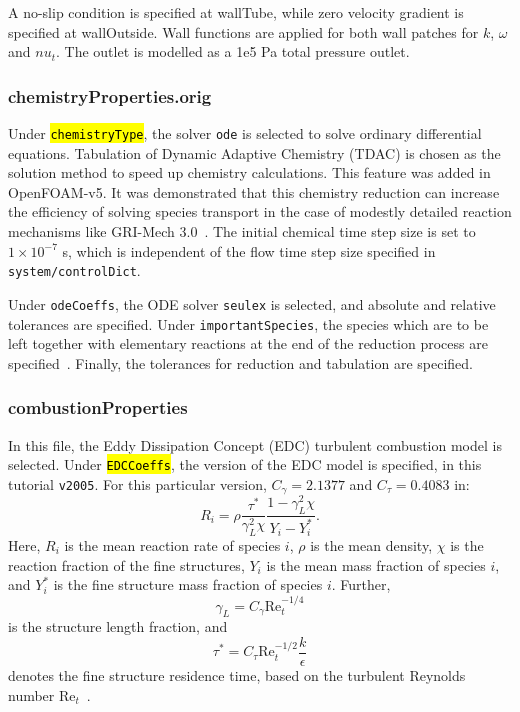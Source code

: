 A no-slip condition is specified at wallTube, while zero velocity gradient is specified at wallOutside. Wall functions are applied for both wall patches for $k$, $\omega$ and $nu_t$. The outlet is modelled as a 1e5 Pa total pressure outlet.

\subsubsection*{chemistryProperties.orig}
Under \hl{\texttt{chemistryType}}, the solver \texttt{ode} is selected to solve ordinary differential equations. Tabulation of Dynamic Adaptive Chemistry (TDAC) is chosen as the solution method to speed up chemistry calculations. This feature was added in OpenFOAM-v5. It was demonstrated that this chemistry reduction can increase the efficiency of solving species transport in the case of modestly detailed reaction mechanisms like GRI-Mech 3.0~\cite{ref6}. The initial chemical time step size is set to $1 \times 10^{-7}$ s, which is independent of the flow time step size specified in \texttt{system/controlDict}. 

Under \texttt{odeCoeffs}, the ODE solver \texttt{seulex} is selected, and absolute and relative tolerances are specified. Under \texttt{importantSpecies}, the species which are to be left together with elementary reactions at the end of the reduction process are specified~\cite{ref7}. Finally, the tolerances for reduction and tabulation are specified.

\subsubsection*{combustionProperties}
In this file, the Eddy Dissipation Concept (EDC) turbulent combustion model is selected. Under \hl{\texttt{EDCCoeffs}}, the version of the EDC model is specified, in this tutorial \texttt{v2005}. For this particular version, $C_\gamma = 2.1377$ and $C_\tau = 0.4083$ in:
\begin{equation}
R_i = \rho \frac{\tau^*}{\gamma_L^2 \chi} \frac{1 - \gamma_L^2 \chi}{Y_i - Y_i^*}.
\end{equation}
Here, $R_i$ is the mean reaction rate of species $i$, $\rho$ is the mean density, $\chi$ is the reaction fraction of the fine structures, $Y_i$ is the mean mass fraction of species $i$, and $Y_i^*$ is the fine structure mass fraction of species $i$. Further,
\begin{equation}
\gamma_L = C_\gamma \mathrm{Re}_t^{-1/4}
\end{equation}
is the structure length fraction, and
\begin{equation}
\tau^* = C_\tau \mathrm{Re}_t^{-1/2} \frac{k}{\epsilon}
\end{equation}
denotes the fine structure residence time, based on the turbulent Reynolds number $\mathrm{Re}_t$~\cite{ref8}.

